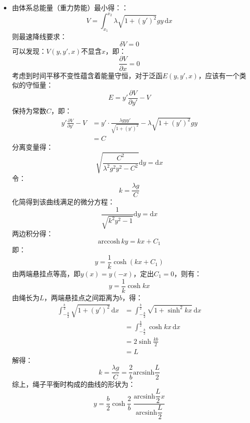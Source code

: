 \documentclass[a4paper,fontset=windows]{ctexart}
\begin{document}
\begin{itemize}
        \item[2.]
        由体系总能量（重力势能）最小得：：
        \[
        V = \int_{x_1}^{x_2}\lambda\sqrt{1 + (y')^2}gy\,\mathrm{d}x
        \]
        则最速降线要求：
        \[
        \delta V = 0
        \]
        可以发现：$V(y,y',x)$不显含$x$，即：
        \[
        \frac{\partial V}{\partial x} = 0
        \]
        考虑到时间平移不变性蕴含着能量守恒，对于泛函$E(y,y',x)$，应该有一个类似的守恒量：
        \[
        E = y'\frac{\partial V}{\partial y'} - V
        \]
        保持为常数$C$，即：
        \begin{align*}
            y'\frac{\partial V}{\partial y'} - V
            &= y'\cdot\frac{\lambda gyy'}{\sqrt{1+(y')^2}} - \lambda\sqrt{1 + (y')^2}gy \\
            &= C
        \end{align*}
        分离变量得：
        \[
        \sqrt{\frac{C^2}{\lambda^2 g^2 y^2 - C^2}}\mathrm{d}y = \mathrm{d}x
        \]
        令：
        \[
        k = \frac{\lambda g}{C}
        \]
        化简得到该曲线满足的微分方程：
        \[
        \frac{1}{\sqrt{k^2 y^2 - 1}}\mathrm{d}y = \mathrm{d}x
        \]
        两边积分得：
        \[
        \mathrm{arccosh}\,ky = kx + C_1
        \]
        即：
        \[
        y = \frac{1}{k}\cosh(kx + C_1)
        \]
        由两端悬挂点等高，即$y(x) = y(-x)$，定出$C_1 = 0$，则有：
        \[
        y = \frac{1}{k}\cosh kx
        \]
        由绳长为$L$，两端悬挂点之间距离为$b$，得：
        \begin{align*}
        \int_{-\tfrac{b}{2}}^{\tfrac{b}{2}}\sqrt{1+(y')^2}\,\mathrm{d}x
        &= \int_{-\tfrac{b}{2}}^{\tfrac{b}{2}}\sqrt{1+\sinh^2{kx}}\,\mathrm{d}x \\
        &= \int_{-\tfrac{b}{2}}^{\tfrac{b}{2}}\cosh{kx}\,\mathrm{d}x \\
        &= 2\sinh\frac{kb}{2} \\
        &= L
        \end{align*}
        解得：
        \[
        k = \frac{\lambda g}{C} =\frac{2}{b}\mathrm{arcsinh}\frac{L}{2}
        \]
        综上，绳子平衡时构成的曲线的形状为：
        \[
        y = \frac{b}{2}\cosh{\frac{2}{b}}\;\frac{\mathrm{arcsinh}\dfrac{L}{2}x}{\mathrm{arcsinh}\dfrac{L}{2}}
        \]
        \bigskip


\end{itemize}
\end{document}
